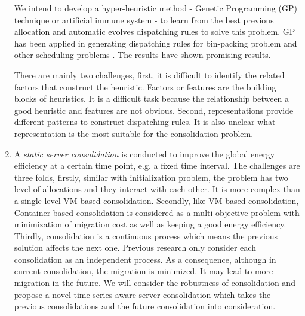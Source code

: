 \begin{enumerate}
We intend to develop a hyper-heuristic method - Genetic Programming (GP) technique \cite{Banzhaf:1998wc} or artificial immune system \cite{Hofmeyr:2000ju}- to learn from the best previous allocation and automatic evolves dispatching rules to solve this problem. GP has been applied in generating dispatching rules for bin-packing problem \cite{Burke:2006ei, SoteloFigueroa:2013be} and other scheduling problems \cite{Nguyen:2014eu}. The results have shown promising results.

There are mainly two challenges, first, it is difficult to identify the related factors that construct the heuristic. Factors or features are the building blocks of heuristics. It is a difficult task because the relationship between a good heuristic and features are not obvious. Second, representations provide different patterns to construct dispatching rules. It is also unclear what representation is the most suitable for the consolidation problem. 

\item A \emph{static server consolidation} is conducted to improve the global energy efficiency at a certain time point, e.g. a fixed time interval. 
The challenges are three folds, firstly, similar with initialization problem, the problem has two level of allocations and they interact with each other. It is more complex than a single-level VM-based consolidation. Secondly, like VM-based consolidation, Container-based consolidation is considered as a multi-objective problem with minimization of migration cost as well as keeping a good energy efficiency. Thirdly, consolidation is a continuous process which means the previous solution affects the next one. Previous research only consider each consolidation as an independent process. As a consequence, although in current consolidation, the migration is minimized. It may lead to more migration in the future. We will consider the robustness of consolidation and propose a novel time-series-aware server consolidation which takes the previous consolidations and the future consolidation into consideration. 



\end{enumerate}
